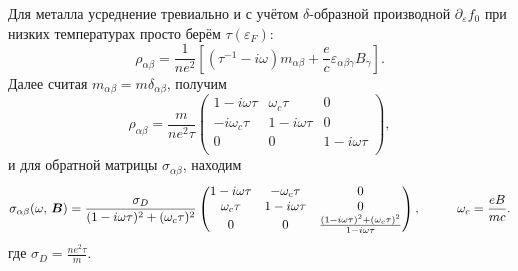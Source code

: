 Для металла усреднение тревиально и с учётом $\delta$-образной производной $\partial_\varepsilon f_0$ при низких температурах просто берём $\tau(\varepsilon_F)$:
\begin{equation*}
	\rho_{\alpha \beta} = \frac{1}{n e^2}\left[
		(\tau^{-1} - i \omega) m_{\alpha \beta} + \frac{e}{c} \varepsilon_{\alpha \beta \gamma} B_\gamma
	\right].
\end{equation*}
Далее считая $m_{\alpha \beta} = m \delta_{\alpha \beta}$, получим
\begin{equation*}
	\rho_{\alpha \beta} = \frac{m}{n e^2 \tau} \begin{pmatrix}
	    1- i \omega \tau & \omega_c \tau & 0 \\
	    - i \omega_c \tau & 1-i \omega \tau & 0 \\
	    0 & 0 & 1- i \omega \tau \\
	\end{pmatrix},
\end{equation*}
и для обратной матрицы $\sigma_{\alpha \beta}$, находим
\begin{equation*}
	\sigma_{\alpha \beta} (\omega,\, \vc{B}) = \frac{\sigma_D}{(1-i \omega \tau)^2 + (\omega_c \tau)^2} \begin{pmatrix}
	    1- i \omega \tau & - \omega_c \tau & 0 \\
	    \omega_c \tau & 1-i \omega \tau & 0 \\
	    0 & 0 & \frac{(1-i \omega \tau)^2 + (\omega_c \tau)^2}{1-i \omega \tau}  \\
	\end{pmatrix},
	\hspace{10 mm} 
	\omega_c = \frac{e B}{m c}.
\end{equation*}
где $\sigma_D = \frac{n e^2 \tau}{m}$.


